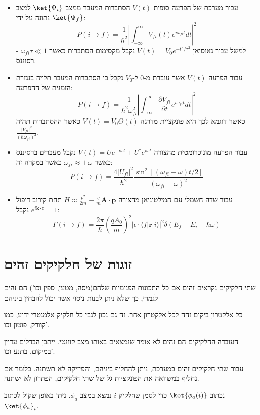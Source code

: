 \documentclass{tstextbook}
\begin{document}
\begin{summary}
  \begin{itemize}
    \item עבור מערכת של הפרעה סופית \(V(t)\) הסתברות המעבר ממצב \(\ket{\Psi_{i}}\) למצב \(\ket{\Psi_{f}}\) נתונה על ידי:
$$P(i\to f)={\frac{1}{\hbar^{2}}}\left|\int_{-\infty}^{\infty}V_{f i}(t)e^{i\omega_{f i}t}d t\right|^{2}$$
למשל עבור גאוסיאן \(V(t)=V_{0}e^{ -t^{2}/\tau^{2} }\) נקבל מקסימום הסתברות כאשר \(\omega_{fi}\tau\ll 1\) - רסוננס.
    \item עבור הפרעה \(V(t)\) אשר עוברת מ-0 ל-\(V_{0}\) נקבל כי הסתברות המעבר תלויה בנגזרת הזמנית של ההפרעה:
$$P(i\to f)=\frac{1}{\hbar^{2}\omega_{f i}^{2}}\left|\int_{-\infty}^{\infty}\frac{\partial V_{f i}}{\partial t}e^{i\omega_{f i}t}d t\right|^{2}$$
כאשר דוגמא לכך היא פונקציית מדרגה \(V(t)=V_{0}\Theta(t)\) כאשר ההסתברות תהיה \(\frac{|V_{fi}|^{2}}{(\hbar \omega_{fi})^{2}}\).
    \item עבור הפרעה מונוכרומטית מהצורה \(V(t)=U e^{-i\omega t}+U^{\dagger}e^{i\omega t}\) נקבל מעברים ברסיננס כאשר \(\omega_{fi}\approx\pm \omega\) כאשר במקרה זה:
$$P(i\to f)=\frac{4|U_{f i}|^{2}}{\hbar^{2}}\frac{\sin^{2}[(\omega_{f i}-\omega)t/2]}{(\omega_{f i}-\omega)^{2}}$$
    \item עבור שדה חשמלי עם המילטוניאן מהצורה \(H\approx \frac{p^{2}}{2m}-\frac{q}{m}\mathbf{A\cdot p}\) תחת קירוב דיפול \(e^{ i\mathbf{k\cdot r} }=1\) נקבל:
$$\Gamma(i\to f)=\frac{2\pi}{\hbar}\left(\frac{q A_{0}}{m}\right)^{2}|\epsilon\cdot\langle f|\mathbf{r}|i\rangle|^{2}\delta(E_{f}-E_{i}-\hbar\omega)$$
  \end{itemize}
\end{summary}

\section{זוגות של חלקיקים זהים}

\begin{definition}
שתי חלקיקים נקראים זהים אם כל התכונות הפנימיות שלהם(מסה, מטען, ספין וכו') הם זהים לגמרי, כך שלא ניתן לבנות ניסוי אשר יכול להבחין ביניהם

\end{definition}
\begin{example}
כל אלקטרון ביקום זהה לכל אלקטרון אחר. זה גם נכון לגבי כל חלקיק אלמנטרי ידוע, כמו קוורק, פוטון וכו'.

\end{example}
\begin{remark}
העובדה החלקיקים הם זהים לא אומר שנמצאים באותו מצב קוונטי. ייתכן הבדלים עדיין במיקום, בתנע וכו'.

\end{remark}
\begin{proposition}
עבור שתי חלקיקים זהים במערכת, ניתן להחליף ביניהם, והפיזיקה לא תשתנה. כלומר אם נחליף במשוואה את הפונקציות גל של שתי חלקיקים, הפתרון לא ישתנה.

\end{proposition}
\begin{symbolize}
נכתוב \(\ket{\phi_{a}(i)}\) כדי לסמן שחלקיק \(i\) נמצא במצב \(\phi_{a}\). ניתן באופן שקול לכתוב \(\ket{\phi_{a}}_{i}\).

\end{symbolize}
\end{document}
